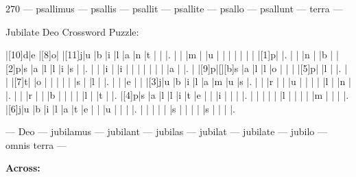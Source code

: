 \documentclass[12pt]{article}
\begin{document}
\pagestyle{fancy}
\fancyhf{}
\renewcommand{\headrulewidth}{0pt}
\renewcommand{\footrulewidth}{0pt}
\libertine
\renewcommand\PuzzleClueFont{\rm\normalsize}
\noindent\begin{rotate}{0}
\small
\end{rotate}
\hfill
\begin{rotate}{270}
\qquad \qquad \small --- psallimus --- psallis --- psallit --- psallite --- psallo --- psallunt --- terra --- 

\end{rotate}
\begin{center}
  \huge{Jubilate Deo Crossword Puzzle:}
\end{center}
\vspace{1.5cm}
\begin{Puzzle}{15}{15}
  |[10]d|e   |[8]o|{}  |[11]j|u   |b   |i   |l   |a   |n   |t   |{}  |{}  |.
  |{}  |{}  |m   |{}  |u   |{}  |{}  |{}  |{}  |{}  |{}  |{}  |[1]p|{}  |.
  |{}  |{}  |n   |{}  |b   |{}  |[2]p|s   |a   |l   |l   |i   |s   |{}  |.
  |{}  |{}  |i   |{}  |i   |{}  |{}  |{}  |{}  |{}  |{}  |{}  |a   |{}  |.
  |{}  |[9]p|[][b]s   |a   |l   |l   |o   |{}  |{}  |{}  |[5]p|{}  |l   |{}  |.
  |{}  |{}  |[7]t|{}  |o   |{}  |{}  |{}  |{}  |{}  |s   |{}  |l   |{}  |.
  |{}  |{}  |e   |{}  |{}  |[3]j|u   |b   |i   |l   |a   |m   |u   |s   |.
  |{}  |{}  |r   |{}  |{}  |u   |{}  |{}  |{}  |{}  |l   |{}  |n   |{}  |.
  |{}  |{}  |r   |{}  |{}  |b   |{}  |{}  |{}  |{}  |l   |{}  |t   |{}  |.
  |[4]p|s   |a   |l   |l   |i   |t   |e   |{}  |{}  |i   |{}  |{}  |{}  |.
  |{}  |{}  |{}  |{}  |{}  |l   |{}  |{}  |{}  |{}  |m   |{}  |{}  |{}  |.
  |[6]j|u   |b   |i   |l   |a   |t   |e   |{}  |{}  |u   |{}  |{}  |{}  |.
  |{}  |{}  |{}  |{}  |{}  |s   |{}  |{}  |{}  |{}  |s   |{}  |{}  |{}  |.
\end{Puzzle}
\begin{rotate}{90}
\small 
\qquad --- Deo --- jubilamus --- jubilant --- jubilas --- jubilat --- jubilate --- jubilo --- omnis terra --- \end{rotate}
\hspace{-10pt}
\begin{PuzzleClues}{\textbf{Across:}}
\end{PuzzleClues}
\end{document}
